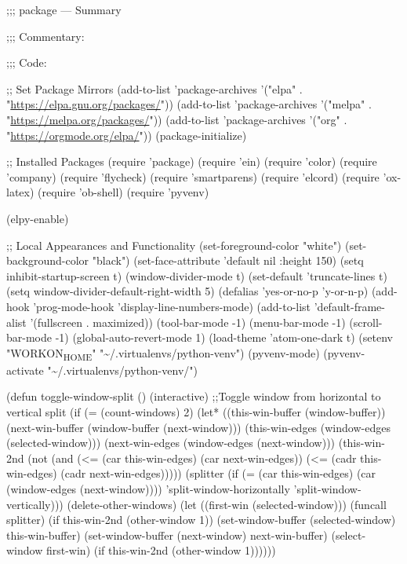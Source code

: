 \documentclass[11pt]{article}
\date{\today}
\title{}
\begin{document}
\tableofcontents

;;; package --- Summary

;;; Commentary:

;;; Code:

;; Set Package Mirrors
(add-to-list 'package-archives '("elpa" . "\url{https://elpa.gnu.org/packages/}"))
(add-to-list 'package-archives '("melpa" . "\url{https://melpa.org/packages/}"))
(add-to-list 'package-archives '("org" . "\url{https://orgmode.org/elpa/}"))
(package-initialize)

;; Installed Packages
(require 'package)
(require 'ein)
(require 'color)
(require 'company)
(require 'flycheck)
(require 'smartparens)
(require 'elcord)
(require 'ox-latex)
(require 'ob-shell)
(require 'pyvenv)

(elpy-enable)

;; Local Appearances and Functionality
(set-foreground-color "white")
(set-background-color "black")
(set-face-attribute 'default nil :height 150)
(setq inhibit-startup-screen t)
(window-divider-mode t)
(set-default 'truncate-lines t)
(setq window-divider-default-right-width 5)
(defalias 'yes-or-no-p 'y-or-n-p)
(add-hook 'prog-mode-hook 'display-line-numbers-mode)
(add-to-list 'default-frame-alist '(fullscreen . maximized))
(tool-bar-mode -1)
(menu-bar-mode -1)
(scroll-bar-mode -1)
(global-auto-revert-mode 1)
(load-theme 'atom-one-dark t)
(setenv "WORKON\textsubscript{HOME}" "\textasciitilde{}/.virtualenvs/python-venv")
(pyvenv-mode)
(pyvenv-activate  "\textasciitilde{}/.virtualenvs/python-venv/")

(defun toggle-window-split ()
  (interactive) ;;Toggle window from horizontal to vertical split
  (if (= (count-windows) 2)
      (let* ((this-win-buffer (window-buffer))
             (next-win-buffer (window-buffer (next-window)))
             (this-win-edges (window-edges (selected-window)))
             (next-win-edges (window-edges (next-window)))
             (this-win-2nd (not (and (<= (car this-win-edges)
                                         (car next-win-edges))
                                     (<= (cadr this-win-edges)
                                         (cadr next-win-edges)))))
             (splitter
              (if (= (car this-win-edges)
                     (car (window-edges (next-window))))
                  'split-window-horizontally
                'split-window-vertically)))
        (delete-other-windows)
        (let ((first-win (selected-window)))
          (funcall splitter)
          (if this-win-2nd (other-window 1))
          (set-window-buffer (selected-window) this-win-buffer)
          (set-window-buffer (next-window) next-win-buffer)
          (select-window first-win)
          (if this-win-2nd (other-window 1))))))
\end{document}
